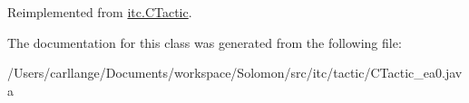 Reimplemented from \hyperlink{classitc_1_1_c_tactic_ae5f5c51a6e04d22bc298dbdec4080770}{itc.CTactic}.

The documentation for this class was generated from the following file:\begin{DoxyCompactItemize}
\item 
/Users/carllange/Documents/workspace/Solomon/src/itc/tactic/CTactic\_\-ea0.java\end{DoxyCompactItemize}

